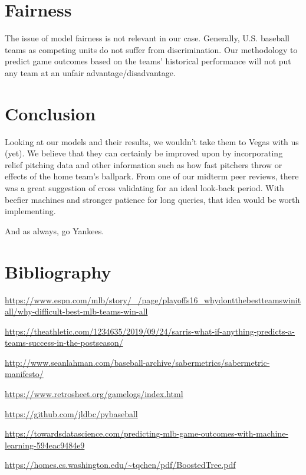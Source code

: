 \documentclass[12pt,onecolumn]{article}
\begin{document}
\section*{Fairness}
The issue of model fairness is not relevant in our case. Generally, U.S. baseball teams as competing units do not suffer from discrimination. Our methodology to predict game outcomes based on the teams’ historical performance will not put any team at an unfair advantage/disadvantage.

\section*{Conclusion}
Looking at our models and their results, we wouldn't take them to Vegas with us (yet). We believe that they can certainly be improved upon by incorporating relief pitching data and other information such as how fast pitchers throw or effects of the home team's ballpark. From one of our midterm peer reviews, there was a great suggestion of cross validating for an ideal look-back period. With beefier machines and stronger patience for long queries, that idea would be worth implementing. \vspace*{4mm}

\noindent
And as always, go Yankees.

\section*{Bibliography}
\url{https://www.espn.com/mlb/story/_/page/playoffs16_whydontthebestteamswinitall/why-difficult-best-mlb-teams-win-all} \vspace*{4mm}

\noindent
\url{https://theathletic.com/1234635/2019/09/24/sarris-what-if-anything-predicts-a-teams-success-in-the-postseason/} \vspace*{4mm}

\noindent
\url{http://www.seanlahman.com/baseball-archive/sabermetrics/sabermetric-manifesto/} \vspace*{4mm}

\noindent
\url{https://www.retrosheet.org/gamelogs/index.html} \vspace*{4mm}

\noindent
\url{https://github.com/jldbc/pybaseball} \vspace*{4mm}

\noindent
\url{https://towardsdatascience.com/predicting-mlb-game-outcomes-with-machine-learning-594eac9484e9} \vspace*{4mm}

\noindent
\url{https://homes.cs.washington.edu/~tqchen/pdf/BoostedTree.pdf}
\end{document}
